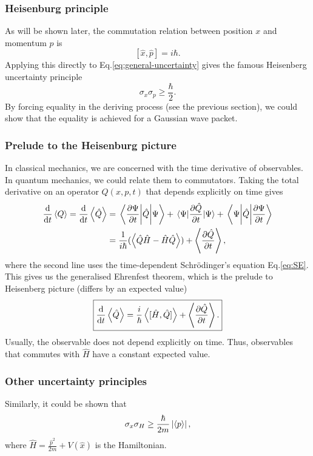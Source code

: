 \documentclass{article}
\theoremstyle{nonumberplain}
\begin{document}
\subsubsection{Heisenburg principle}
As will be shown later, the commutation relation between position $x$ and momentum $p$ is 
\[
    [\hat{x} , \hat{p} ] = i \hbar.
\]
Applying this directly to Eq.\eqref{eq:general-uncertainty} gives the famous Heisenberg uncertainty principle
\begin{equation}
    \sigma _x \sigma _p \geq  \frac{\hbar}{2}.
\end{equation}
By forcing equality in the deriving process (see the previous section), we could show that the equality is achieved for a Gaussian wave packet. 
\subsubsection{Prelude to the Heisenburg picture}
In classical mechanics, we are concerned with the time derivative of observables. In quantum mechanics, we could relate them to commutators. Taking the total derivative on an operator $Q(x,p,t)$ that depends explicitly on time gives 
\[
    \begin{aligned}
        \frac{\mathrm{d}}{\mathrm{d}t} \expval{Q}
        = \frac{\mathrm{d}}{\mathrm{d}t} \ev{\hat{Q} }
        &= \mel{\frac{\partial \Psi }{\partial t} }{\hat{Q} }{\Psi } + 
        \mel{\Psi }{\frac{\partial \hat{Q} }{\partial t} }{\Psi} + 
        \mel{\Psi }{\hat{Q} }{\frac{\partial \Psi }{\partial t} } \\
        &= \frac{1}{i \hbar } (\ev{\hat{Q} \hat{H}  - \hat{H} \hat{Q} }) + \expval{\frac{\partial \hat{Q} }{\partial t} },
    \end{aligned}
\]
where the second line uses the time-dependent Schrödinger's equation Eq.\eqref{eq:SE}. This gives us the generalised Ehrenfest theorem, which is the prelude to Heisenberg picture (differs by an expected value)
\begin{equation}
    \label{eq:gen-ehrenfest}
    \boxed{
        \frac{\mathrm{d}}{\mathrm{d}t} \expval{\hat{Q}}
        = \frac{i}{\hbar } \expval{[\hat{H} ,\hat{Q} ]} + \expval{\frac{\partial \hat{Q} }{\partial t} }.
    }
\end{equation}
Usually, the observable does not depend explicitly on time. Thus, observables that commutes with $\hat{H} $ have a constant expected value. 

\subsubsection{Other uncertainty principles}
Similarly, it could be shown that 
\[
    \sigma _x \sigma _H \geq  \frac{\hbar}{2m} \left\vert \expval{p} \right\vert,
\]
where $\hat{H} = \frac{\hat{p}^2}{ 2m} + V(\hat{x} )$ is the Hamiltonian. 
\end{document}
